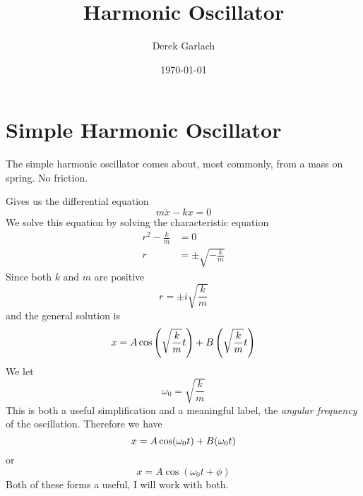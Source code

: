 \documentclass{article}
\author{Derek Garlach}
\title{Harmonic Oscillator}
\date{\today}
\let\sin\relax
\DeclareMathOperator{\sin}{\smash{\mathrm{sin}}}
\begin{document}
\maketitle
\section{Simple Harmonic Oscillator}
The simple harmonic oscillator comes about, most commonly, from a mass on spring. No friction.
\begin{center}
\end{center}
Gives us the differential equation
\begin{equation*}
    m\ddot{x} - kx = 0
\end{equation*}
We solve this equation by solving the characteristic equation
\begin{align*}
    r^2 - \frac{k}{m} &= 0 \\ 
    r &= \pm \sqrt{-\frac{k}{m}}
\end{align*}
Since both $k$ and $m$ are positive
\begin{equation*}
    r = \pm i \sqrt{\frac{k}{m}}
\end{equation*}
and the general solution is
\begin{equation*}
    x = A\cos\left(\sqrt{\frac{k}{m}}t\right) + B\sin\left(\sqrt{\frac{k}{m}}t\right)
\end{equation*}
We let 
\begin{equation*}
    \omega_0 = \sqrt{\frac{k}{m}}
\end{equation*}
This is both a useful simplification and a meaningful label, the \textit{angular frequency} of the oscillation. Therefore we have
\begin{equation*}
    x = A\cos(\omega_0t) + B\sin(\omega_0t)
\end{equation*}
or
\begin{equation*}
    x = A\cos(\omega_0t + \phi)
\end{equation*}
Both of these forms a useful, I will work with both.
\end{document}
